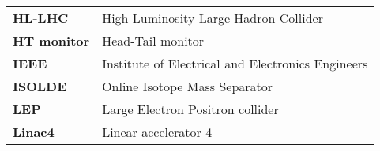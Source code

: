 \begin{flushleft}
\begin{tabular}{l l}
\textbf{HL-LHC} & \qquad\qquad\qquad High-Luminosity Large Hadron Collider \\
\textbf{HT monitor} & \qquad\qquad\qquad Head-Tail monitor \\

\textbf{IEEE} & \qquad\qquad\qquad Institute of Electrical and Electronics Engineers \\

\textbf{ISOLDE} & \qquad\qquad\qquad Online Isotope Mass Separator \\


\textbf{LEP} & \qquad\qquad\qquad Large Electron Positron collider \\
\textbf{Linac4} & \qquad\qquad\qquad Linear accelerator 4 \\
\end{tabular}
\end{flushleft}


\newpage

